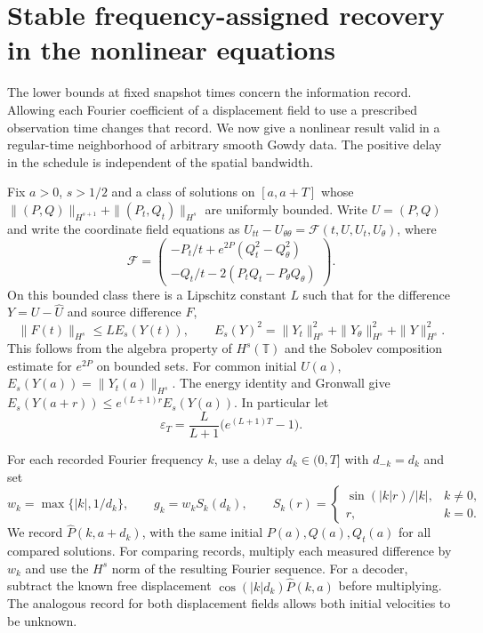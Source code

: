 \section{Stable frequency-assigned recovery in the nonlinear equations}
\label{sec:nonlinear-band}
The lower bounds at fixed snapshot times concern the information
record. Allowing each Fourier coefficient of a displacement field
to use a prescribed observation time changes that record. We now
give a nonlinear result valid in a regular-time neighborhood of
arbitrary smooth Gowdy data. The positive delay in the schedule is
independent of the spatial bandwidth.

Fix $a>0$, $s>1/2$ and a class of solutions on $[a,a+T]$ whose
$\|(P,Q)\|_{H^{s+1}}+\|(P_t,Q_t)\|_{H^s}$ are uniformly bounded.
Write $U=(P,Q)$ and write the coordinate field equations as
$U_{tt}-U_{\theta\theta}=\mathcal F(t,U,U_t,U_\theta)$,
where
\[
 \mathcal F=
 \begin{pmatrix}
 -P_t/t+e^{2P}(Q_t^2-Q_\theta^2)\\
 -Q_t/t-2(P_tQ_t-P_\theta Q_\theta)
 \end{pmatrix}.
\]
On this bounded class there is a Lipschitz constant $L$ such that
for the difference $Y=U-\widehat U$ and source difference $F$,
\[
 \|F(t)\|_{H^s}\le L E_s(Y(t)),\qquad
 E_s(Y)^2=\|Y_t\|_{H^s}^2+\|Y_\theta\|_{H^s}^2+\|Y\|_{H^s}^2.
\]
This follows from the algebra property of $H^s(\mathbb T)$ and
the Sobolev composition estimate for $e^{2P}$ on bounded sets.
For common initial $U(a)$, $E_s(Y(a))=\|Y_t(a)\|_{H^s}$.
The energy identity and Gronwall give
$E_s(Y(a+r))\le e^{(L+1)r}E_s(Y(a))$.
In particular let
\[
 \varepsilon_T = \frac{L}{L+1}\big(e^{(L+1)T}-1\big).
\]

For each recorded Fourier frequency $k$, use a delay $d_k\in(0,T]$
with $d_{-k}=d_k$ and set
\[
 w_k=\max\{|k|,1/d_k\},\qquad
 g_k=w_k S_k(d_k),\qquad
 S_k(r)=
 \begin{cases}
 \sin(|k|r)/|k|,& k\ne0,\\
 r,& k=0.
 \end{cases}
\]
We record $\widehat P(k,a+d_k)$, with the same initial
$P(a),Q(a),Q_t(a)$ for all compared solutions.
For comparing records, multiply each measured difference by $w_k$
and use the $H^s$ norm of the resulting Fourier sequence.
For a decoder, subtract the known free displacement
$\cos(|k|d_k)\widehat P(k,a)$ before multiplying.
The analogous record for both displacement fields
allows both initial velocities to be unknown.

